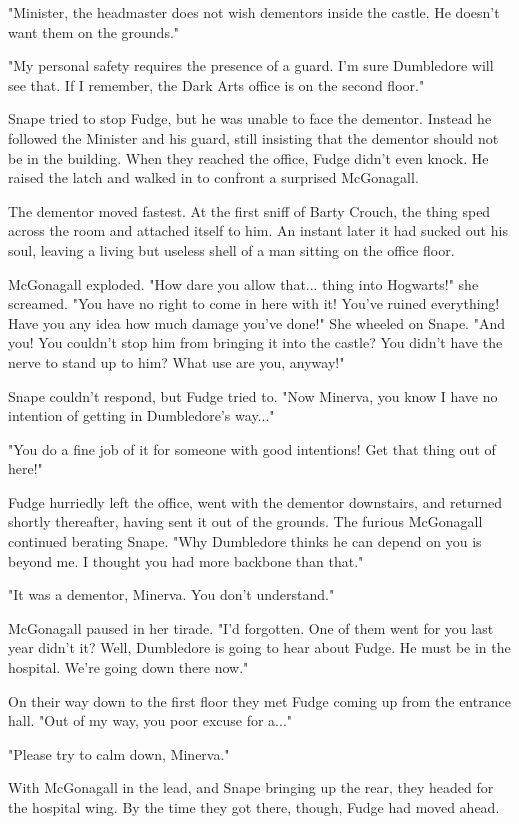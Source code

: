 "Minister, the headmaster does not wish dementors inside the castle. He doesn't want them on the grounds."

"My personal safety requires the presence of a guard. I'm sure Dumbledore will see that. If I remember, the Dark Arts office is on the second floor."

Snape tried to stop Fudge, but he was unable to face the dementor. Instead he followed the Minister and his guard, still insisting that the dementor should not be in the building. When they reached the office, Fudge didn't even knock. He raised the latch and walked in to confront a surprised McGonagall.

The dementor moved fastest. At the first sniff of Barty Crouch, the thing sped across the room and attached itself to him. An instant later it had sucked out his soul, leaving a living but useless shell of a man sitting on the office floor.

McGonagall exploded. "How dare you allow that... thing into Hogwarts!" she screamed. "You have no right to come in here with it! You've ruined everything! Have you any idea how much damage you've done!" She wheeled on Snape. "And you! You couldn't stop him from bringing it into the castle? You didn't have the nerve to stand up to him? What use are you, anyway!"

Snape couldn't respond, but Fudge tried to. "Now Minerva, you know I have no intention of getting in Dumbledore's way..."

"You do a fine job of it for someone with good intentions! Get that thing out of here!"

Fudge hurriedly left the office, went with the dementor downstairs, and returned shortly thereafter, having sent it out of the grounds. The furious McGonagall continued berating Snape. "Why Dumbledore thinks he can depend on you is beyond me. I thought you had more backbone than that."

"It was a dementor, Minerva. You don't understand."

McGonagall paused in her tirade. "I'd forgotten. One of them went for you last year didn't it? Well, Dumbledore is going to hear about Fudge. He must be in the hospital. We're going down there now."

On their way down to the first floor they met Fudge coming up from the entrance hall. "Out of my way, you poor excuse for a..."

"Please try to calm down, Minerva."

With McGonagall in the lead, and Snape bringing up the rear, they headed for the hospital wing. By the time they got there, though, Fudge had moved ahead.

